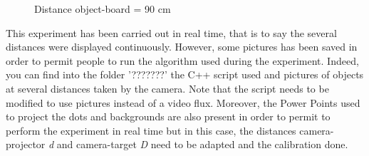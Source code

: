 \begin{figure}[!h] 
\centering
{}
\quad 
{}
\caption{Distance object-board = 90 cm}
\end{figure}


This experiment has been carried out in real time, that is to say the several distances were displayed continuously. However, some pictures has been saved in order to permit people to run the algorithm used during the experiment. Indeed, you can find into the folder '???????' the C++ script used and pictures of objects at several distances taken by the camera. Note that the script needs to be modified to use pictures instead of a video flux. Moreover, the Power Points used to project the dots and backgrounds are also present in order to permit to perform the experiment in real time but in this case, the distances camera-projector \emph{d} and camera-target \emph{D} need to be adapted and the calibration done.


